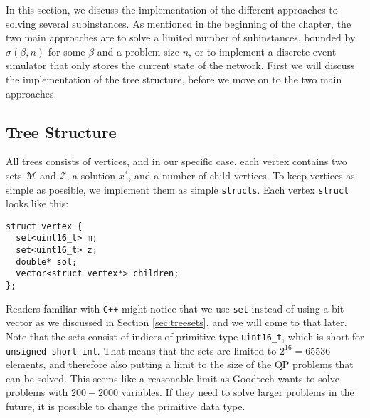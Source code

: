 In this section, we discuss the implementation of the different approaches to
solving several subinstances.
As mentioned in the beginning of the chapter, the two
main approaches are to solve a limited number of subinstances, bounded
by $\sigma(\beta, n)$ for some $\beta$ and a problem size $n$, or to implement
a discrete event simulator that only stores the current state of the network.
First we will discuss the implementation of the tree structure, before we
move on to the two main approaches.

\subsection{Tree Structure}
All trees consists of vertices, and in our specific case, each vertex contains
two sets $\mathcal{M}$ and $\mathcal{Z}$, a solution $x^*$, and a number of
child vertices. To keep vertices as simple as possible, we implement them as
simple \texttt{structs}. Each vertex \texttt{struct} looks like
this:
\begin{verbatim}
struct vertex {
  set<uint16_t> m;
  set<uint16_t> z;
  double* sol;
  vector<struct vertex*> children;
};
\end{verbatim}
Readers familiar with \texttt{C++} might notice that we use
\texttt{set} instead of using a bit vector as we discussed
in Section \ref{sec:treesets}, and we will come to that later. Note that
the sets consist of indices of primitive type \texttt{uint16\_t}, which is
short for \texttt{unsigned short int}. That means that the sets are limited to
$2^{16} = 65536$ elements, and therefore also putting a limit to the size
of the QP problems that can be solved. This seems like a reasonable limit
as Goodtech wants to solve problems with $200 - 2000$ variables.
If they need to solve larger problems in the future, it is possible to change
the primitive data type.

